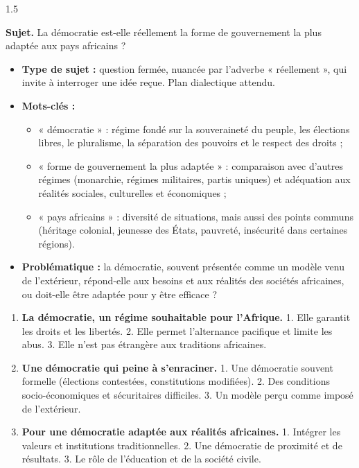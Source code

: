 \documentclass[12pt]{article}
\begin{document}
\begin{spacing}{1.5}

\noindent\textbf{Sujet.} La démocratie est-elle réellement la forme de gouvernement la plus adaptée aux pays africains ?


\begin{itemize}
\item \textbf{Type de sujet :} question fermée, nuancée par l'adverbe « réellement », qui invite à interroger une idée reçue. Plan dialectique attendu.
\item \textbf{Mots-clés :}
  \begin{itemize}
  \item « démocratie » : régime fondé sur la souveraineté du peuple, les élections libres, le pluralisme, la séparation des pouvoirs et le respect des droits ;
  \item « forme de gouvernement la plus adaptée » : comparaison avec d'autres régimes (monarchie, régimes militaires, partis uniques) et adéquation aux réalités sociales, culturelles et économiques ;
  \item « pays africains » : diversité de situations, mais aussi des points communs (héritage colonial, jeunesse des États, pauvreté, insécurité dans certaines régions).
  \end{itemize}
\item \textbf{Problématique :} la démocratie, souvent présentée comme un modèle venu de l'extérieur, répond-elle aux besoins et aux réalités des sociétés africaines, ou doit-elle être adaptée pour y être efficace ?
\end{itemize}


\begin{enumerate}
\item[I.] \textbf{La démocratie, un régime souhaitable pour l'Afrique.} 1. Elle garantit les droits et les libertés. 2. Elle permet l'alternance pacifique et limite les abus. 3. Elle n'est pas étrangère aux traditions africaines.
\item[II.] \textbf{Une démocratie qui peine à s'enraciner.} 1. Une démocratie souvent formelle (élections contestées, constitutions modifiées). 2. Des conditions socio-économiques et sécuritaires difficiles. 3. Un modèle perçu comme imposé de l'extérieur.
\item[III.] \textbf{Pour une démocratie adaptée aux réalités africaines.} 1. Intégrer les valeurs et institutions traditionnelles. 2. Une démocratie de proximité et de résultats. 3. Le rôle de l'éducation et de la société civile.
\end{enumerate}


\end{spacing}
\end{document}
